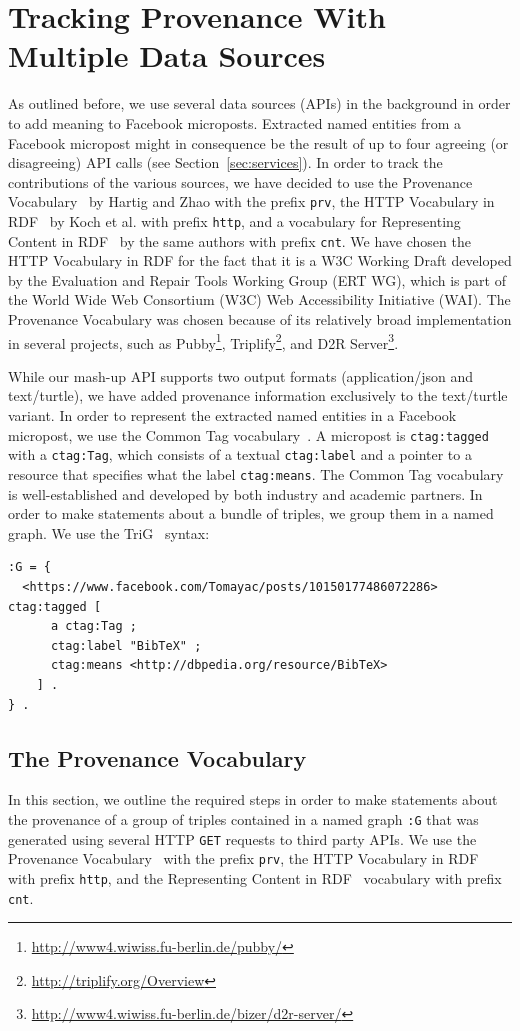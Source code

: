 \documentclass[conference]{IEEEtran}
\begin{document}
\section{Tracking Provenance With Multiple Data Sources}                    \label{sec:tracking}
As outlined before, we use several data sources (APIs) in the background in order to add meaning to Facebook microposts. Extracted named entities from a Facebook micropost might in consequence be the result of up to four agreeing (or disagreeing) API calls (see Section~\ref{sec:services}). In order to track the contributions of the various sources, we have decided to use the Provenance Vocabulary~\cite{Hartig:Provenance} by Hartig and Zhao with the prefix \texttt{prv}, the HTTP Vocabulary in RDF~\cite{HTTP:RDF} by Koch et al. with prefix \texttt{http}, and a vocabulary for Representing Content in RDF~\cite{CNT:RDF} by the same authors with prefix \texttt{cnt}. We have chosen the HTTP Vocabulary in RDF for the fact that it is a W3C Working Draft  developed by the Evaluation and Repair Tools Working Group (ERT WG), which is part of the World Wide Web Consortium (W3C) Web Accessibility Initiative (WAI). The Provenance Vocabulary was chosen because of its relatively broad implementation in several projects, such as Pubby\footnote{\url{http://www4.wiwiss.fu-berlin.de/pubby/}}, Triplify\footnote{\url{http://triplify.org/Overview}}, and D2R Server\footnote{\url{http://www4.wiwiss.fu-berlin.de/bizer/d2r-server/}}.

While our mash-up API supports two output formats (application/json and text/turtle), we have added provenance information exclusively to the text/turtle variant. In order to represent the extracted named entities in a Facebook micropost, we use the Common Tag vocabulary~\cite{CommonTag:Spec}. A micropost is \texttt{ctag:tagged} with a \texttt{ctag:Tag}, which consists of a textual \texttt{ctag:label} and a pointer to a resource that specifies what the label \texttt{ctag:means}. The Common Tag vocabulary is well-established and developed by both industry and academic partners. In order to make statements about a bundle of triples, we group them in a named graph. We use the TriG~\cite{Bizer:TriG} syntax:
\begin{lstlisting}
:G = {
  <https://www.facebook.com/Tomayac/posts/10150177486072286> ctag:tagged [
      a ctag:Tag ;
      ctag:label "BibTeX" ;
      ctag:means <http://dbpedia.org/resource/BibTeX>
    ] .
} .
\end{lstlisting}

\subsection{The Provenance Vocabulary}                                      \label{sec:provenance}
In this section, we outline the required steps in order to make statements about the provenance of a group of triples contained in a named graph \texttt{:G} that was generated using several HTTP \texttt{GET} requests to third party APIs. We use the Provenance Vocabulary~\cite{Hartig:Provenance} with the prefix \texttt{prv}, the HTTP Vocabulary in RDF~\cite{HTTP:RDF} with prefix \texttt{http}, and the Representing Content in RDF~\cite{CNT:RDF} vocabulary with prefix \texttt{cnt}.
\end{document}
